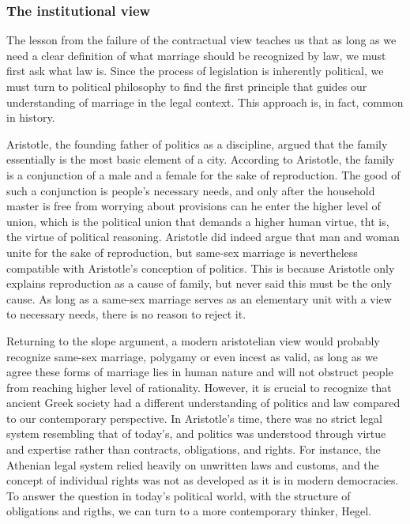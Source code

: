 \documentclass[man,floatsintext]{apa7}
\begin{document}
\subsubsection{The institutional view}

The lesson from the failure of the contractual view teaches us that as long as we need a clear definition of what marriage should be recognized by law, we must first ask what law is.  Since the process of legislation is inherently political, we must turn to political philosophy to find the first principle that guides our understanding of marriage in the legal context. This approach is, in fact, common in history.

Aristotle, the founding father of politics as a discipline, argued that the family essentially is the most basic element of a city. According to Aristotle, the family is a conjunction of a male and a female for the sake of reproduction. The good of such a conjunction is people's necessary needs, and only after the household master is free from worrying about provisions can he enter the higher level of union, which is the political union that demands a higher human virtue, tht is, the virtue of political reasoning. Aristotle did indeed argue that man and woman unite for the sake of reproduction, but same-sex marriage is nevertheless compatible with Aristotle's conception of politics. This is because Aristotle only explains reproduction as a cause of family, but never said this must be the only cause. As long as a same-sex marriage serves as an elementary unit with a view to necessary needs, there is no reason to reject it.\autocite{aristotePolitics1984}

Returning to the slope argument, a modern aristotelian view would probably recognize same-sex marriage, polygamy or even incest as valid, as long as we agree these forms of marriage lies in human nature and will not obstruct people from reaching higher level of rationality. However, it is crucial to recognize that ancient Greek society had a different understanding of politics and law compared to our contemporary perspective. In Aristotle's time, there was no strict legal system resembling that of today's, and politics was understood through virtue and expertise rather than contracts, obligations, and rights. For instance, the Athenian legal system relied heavily on unwritten laws and customs, and the concept of individual rights was not as developed as it is in modern democracies. To answer the question in today's political world, with the structure of obligations and rigths, we can turn to a more contemporary thinker, Hegel.
\end{document}

